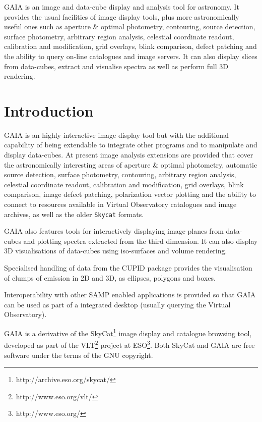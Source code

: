 \documentclass[twoside,11pt]{article}
\newcommand{\stardocinitials}  {SUN}
\newcommand{\stardocnumber}    {214.41}
\newcommand{\stardocabstract} {GAIA is an image and data-cube display
and analysis tool for astronomy. It provides the usual facilities of image
display tools, plus more astronomically useful ones such as aperture \&
optimal photometry, contouring, source detection, surface photometry,
arbitrary region analysis, celestial coordinate readout, calibration
and modification, grid overlays, blink comparison, defect patching and
the ability to query on-line catalogues and image servers. It can
also display slices from data-cubes, extract and visualise spectra as
well as perform full 3D rendering.}
\newcommand{\stardocname}{\stardocinitials /\stardocnumber}
\newcommand{\htmladdnormallinkfoot}[2]{#1\footnote{#2}}
\newenvironment{latexonly}{}{}
\newcommand{\xref}[3]{#1}
\newcommand{\xlabel}[1]{}
\renewcommand{\_}{\texttt{\symbol{95}}}
\newcommand{\mytt}[1]{{\texttt{#1}}}
\renewcommand{\thepage}{\roman{page}}
\begin{document}
\stardocabstract
  \newpage
  \begin{latexonly}
    \setlength{\parskip}{0mm}
    \tableofcontents
    \setlength{\parskip}{\medskipamount}
    \markboth{\stardocname}{\stardocname}
  \end{latexonly}
\cleardoublepage
\renewcommand{\thepage}{\arabic{page}}
\setcounter{page}{1}


\section{Introduction\xlabel{introduction}\label{introduction}}

GAIA is an highly interactive image display tool but with the additional
capability of being extendable to integrate other programs and to manipulate
and display data-cubes.  At present image analysis extensions are provided
that cover the astronomically interesting areas of aperture \& optimal
photometry, automatic source detection, surface photometry, contouring,
arbitrary region analysis, celestial coordinate readout, calibration and
modification, grid overlays, blink comparison, image defect patching,
polarization vector plotting and the ability to connect to resources available
in Virtual Observatory catalogues and image archives, as well as the older
\mytt{Skycat} formats.

GAIA also features tools for interactively displaying image planes from
data-cubes and plotting spectra extracted from the third dimension. It can
also display 3D visualisations of data-cubes using iso-surfaces and volume
rendering.

Specialised handling of data from the \xref{CUPID}{sun255}{} package provides
the visualisation of clumps of emission in 2D and 3D, as ellipses, polygons
and boxes.

Interoperability with other SAMP enabled applications is provided so that
GAIA can be used as part of a integrated desktop (usually querying the
Virtual Observatory).

GAIA is a derivative of the
\htmladdnormallinkfoot{SkyCat}{http://archive.eso.org/skycat/} image
display and catalogue browsing tool, developed as part of the
\htmladdnormallinkfoot{VLT}{http://www.eso.org/vlt/} project at
\htmladdnormallinkfoot{ESO}{http://www.eso.org/}. Both SkyCat and GAIA are
free software under the terms of the GNU copyright.
\end{document}
